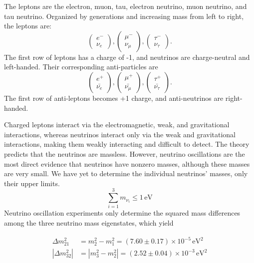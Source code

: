 The leptons are the electron, muon, tau, electron neutrino, muon neutrino, and tau neutrino. Organized by generations and increasing mass from left to right, the leptons are: 
\[
\begin{pmatrix} e^- \\ \nu_{e} \end{pmatrix},
\begin{pmatrix} \mu^- \\ \nu_{\mu} \end{pmatrix},
\begin{pmatrix} \tau^- \\ \nu_{\tau} \end{pmatrix}.
\]
The first row of leptons has a charge of -1, and neutrinos are charge-neutral and left-handed. Their corresponding anti-particles are 
\[
\begin{pmatrix} e^+ \\ \bar{\nu_{e}} \end{pmatrix},
\begin{pmatrix} \mu^+ \\ \bar{\nu_{\mu}} \end{pmatrix},
\begin{pmatrix} \tau^+ \\ \bar{\nu_{\tau}} \end{pmatrix}.
\]
The first row of anti-leptons becomes +1 charge, and anti-neutrinos are right-handed.

Charged leptons interact via the electromagnetic, weak, and gravitational interactions, whereas neutrinos interact only via the weak and gravitational interactions, making them weakly interacting and difficult to detect. 
The theory predicts that the neutrinos are massless. However, neutrino oscillations are the most direct evidence that neutrinos have nonzero masses, although these masses are very small. We have yet to determine the individual neutrinos’ masses, only their upper limits. 
\begin{equation}
    \sum_{i=1}^{3} m_{\nu_i} \leq 1 \, \text{eV}
\end{equation} 
Neutrino oscillation experiments only determine the squared mass differences among the three neutrino mass eigenstates, which yield~\cite {PDG2024}

\begin{equation}
\label{mass_split}
\begin{split}
    \Delta m_{21}^2 &=m_2^2 - m_1^2 = (7.60 \pm 0.17) \times 10^{-5} \, \text{eV}^2 \\
    |\Delta m_{32}^2| &=|m_3^2 - m_2^2| = (2.52 \pm 0.04) \times 10^{-3} \, \text{eV}^2 
\end{split}
\end{equation}

